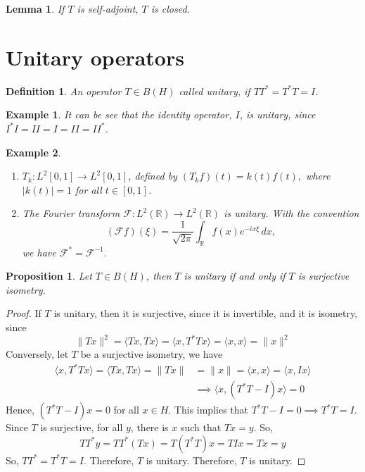 \documentclass{report}
\newtheorem{lem}{Lemma}
\newtheorem{defn}{Definition}
\newtheorem{exm}{Example}
\newtheorem{prop}{Proposition}
\begin{document}
\begin{lem}
  If $T$ is self-adjoint, $T$ is closed.
\end{lem}

\section{Unitary operators}

\begin{defn}
An operator $T \in B(H)$ called unitary, if $TT^{*}=T^{*}T=I$.
\end{defn}

\begin{exm} \label{IdIsUnitary}
  It can be see that the identity operator, $I$, is unitary, since $I^{*}I=II=I=II=II^{*}$.
\end{exm}

\begin{exm}
    \begin{enumerate}
        \item $T_k:L^2[0,1]\to L^2[0,1]$, defined by
        $
        (T_kf)(t)=k(t)f(t),
        $
        where $|k(t)|=1$ for all $t\in[0,1]$.
        \item The Fourier transform $\mathcal{F}:L^2(\mathbb{R})\to L^2(\mathbb{R})$ is unitary. 
With the convention
\[
(\mathcal{F}f)(\xi)=\frac{1}{\sqrt{2\pi}}\int_{\mathbb{R}} f(x)e^{-ix\xi}\,dx,
\]
we have
$
\mathcal{F}^*=\mathcal{F}^{-1}.
$
    \end{enumerate}
  \end{exm}


\begin{prop}
Let $T \in B(H)$, then $T$ is unitary if and only if $T$ is surjective isometry.
\end{prop}
\begin{proof}
  If $T$ is unitary, then it is surjective, since it is invertible, and it is isometry, since
  $$
  \|Tx\|^{2}=\langle Tx,Tx\rangle=\langle x,T^{*}Tx\rangle=\langle x,x\rangle=\|x\|^{2}
  $$
  Conversely, let $T$ be a surjective isometry, we have
  $$
  \begin{aligned}
    \langle x,T^{*}Tx\rangle = \langle Tx,Tx\rangle = \lVert Tx\rVert &= \lVert x\rVert = \langle x,x\rangle = \langle x,Ix\rangle\\
                                                                      &\implies \langle x,(T^{*}T-I)x\rangle = 0
  \end{aligned}
  $$
  Hence, $(T^{*}T-I)x = 0$ for all $x\in H$. This implies that $T^{*}T-I = 0\implies T^{*}T = I$. Since $T$ is surjective, for all $y$, there is $x$ such that $Tx=y$. So,
  $$
  TT^{*}y=TT^{*}(Tx)=T(T^{*}T)x=TIx=Tx=y
  $$
  So, $TT^{*}=T^{*}T=I$. Therefore, $T$ is unitary.
  Therefore, $T$ is unitary.
\end{proof}
\end{document}
